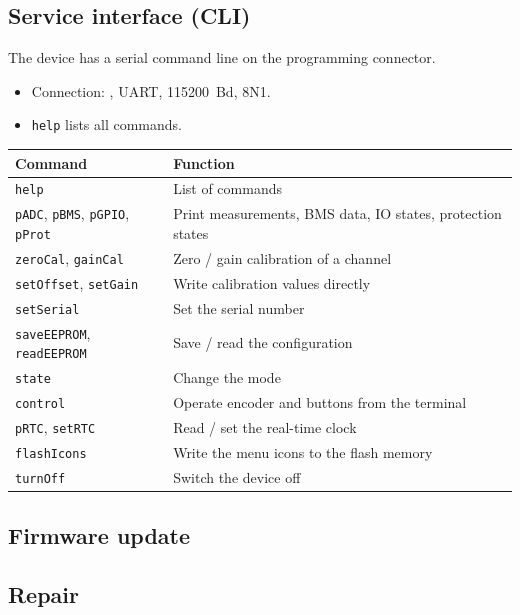 \subsection{Service interface (CLI)}
\label{sec:cli}
The device has a serial command line on the programming connector.
\begin{itemize}
    \item Connection: , UART, \qty{115200}{Bd}, 8N1.
    \item \texttt{help} lists all commands.
\end{itemize}

\begin{longtable}{p{4cm}p{11.5cm}}
    \rowcolor{gray} \textbf{Command} & \textbf{Function} \\ \endhead
    \texttt{help}                 & List of commands \\
    \texttt{pADC}, \texttt{pBMS}, \texttt{pGPIO}, \texttt{pProt} & Print measurements, \ac{BMS} data, IO states, protection states \\
    \texttt{zeroCal}, \texttt{gainCal} & Zero / gain calibration of a channel \\
    \texttt{setOffset}, \texttt{setGain} & Write calibration values directly \\
    \texttt{setSerial}            & Set the serial number \\
    \texttt{saveEEPROM}, \texttt{readEEPROM} & Save / read the configuration \\
    \texttt{state}                & Change the mode \\
    \texttt{control}              & Operate encoder and buttons from the terminal \\
    \texttt{pRTC}, \texttt{setRTC} & Read / set the real-time clock \\
    \texttt{flashIcons}           & Write the menu icons to the flash memory \\
    \texttt{turnOff}              & Switch the device off \\
\end{longtable}

\subsection{Firmware update}
\label{sec:fwupdate}

\subsection{Repair}

